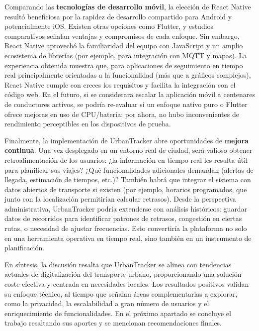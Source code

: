 Comparando las \textbf{tecnologías de desarrollo móvil}, la elección de React Native resultó beneficiosa por la rapidez de desarrollo compartido para Android y potencialmente iOS. Existen otras opciones como Flutter, y estudios comparativos señalan ventajas y compromisos de cada enfoque\cite{macias2021flutterrn}. Sin embargo, React Native aprovechó la familiaridad del equipo con JavaScript y un amplio ecosistema de librerías (por ejemplo, para integración con MQTT y mapas). La experiencia obtenida muestra que, para aplicaciones de seguimiento en tiempo real principalmente orientadas a la funcionalidad (más que a gráficos complejos), React Native cumple con creces los requisitos y facilita la integración con el código web. En el futuro, si se considerara escalar la aplicación móvil a centenares de conductores activos, se podría re-evaluar si un enfoque nativo puro o Flutter ofrece mejoras en uso de CPU/batería; por ahora, no hubo inconvenientes de rendimiento perceptibles en los dispositivos de prueba.

Finalmente, la implementación de UrbanTracker abre oportunidades de \textbf{mejora continua}. Una vez desplegado en un entorno real de ciudad, será valioso obtener retroalimentación de los usuarios: ¿la información en tiempo real les resulta útil para planificar sus viajes? ¿Qué funcionalidades adicionales demandan (alertas de llegada, estimación de tiempos, etc.)? También habrá que integrar el sistema con datos abiertos de transporte si existen (por ejemplo, horarios programados, que junto con la localización permitirían calcular retrasos). Desde la perspectiva administrativa, UrbanTracker podría extenderse con análisis históricos: guardar datos de recorridos para identificar patrones de retrasos, congestión en ciertas rutas, o necesidad de ajustar frecuencias. Esto convertiría la plataforma no solo en una herramienta operativa en tiempo real, sino también en un instrumento de planificación.

En síntesis, la discusión resalta que UrbanTracker se alinea con tendencias actuales de digitalización del transporte urbano, proporcionando una solución coste-efectiva y centrada en necesidades locales. Los resultados positivos validan su enfoque técnico, al tiempo que señalan áreas complementarias a explorar, como la privacidad, la escalabilidad a gran número de usuarios y el enriquecimiento de funcionalidades. En el próximo apartado se concluye el trabajo resaltando sus aportes y se mencionan recomendaciones finales.

